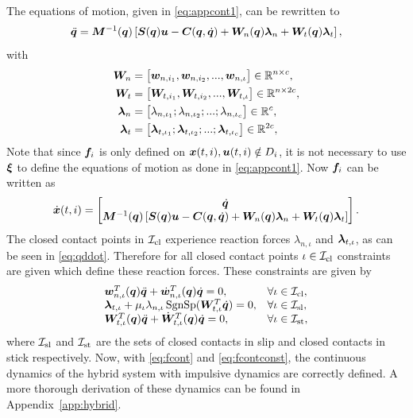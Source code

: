 \documentclass[../DC2017114Bouma.tex]{subfiles}
\begin{document}
The equations of motion, given in \eqref{eq:appcont1}, can be rewritten to
\begin{align}
\ddot{{\boldsymbol{q}}} = {\boldsymbol{M}}^{-1}({\boldsymbol{q}})\left[ {\boldsymbol{S}}({\boldsymbol{q}}){\boldsymbol{u}} - {\boldsymbol{C}}({\boldsymbol{q}},\dot{{\boldsymbol{q}}}) + {\boldsymbol{W}}_{n}({\boldsymbol{q}})\boldsymbol{\lambda}_{n} + {\boldsymbol{W}}_{t}({\boldsymbol{q}})\boldsymbol{\lambda}_{t}\right],\label{eq:qddot}
\end{align}
with
\begin{align}
{\boldsymbol{W}}_n &= \begin{bmatrix}
{\boldsymbol{w}}_{n,i_1},{\boldsymbol{w}}_{n,i_2},...,{\boldsymbol{w}}_{n,\iota}
\end{bmatrix}\in\mathbb{R}^{n\times c},\\
{\boldsymbol{W}}_t &= \begin{bmatrix}
{\boldsymbol{W}}_{t,i_1},{\boldsymbol{W}}_{t,i_2},...,{\boldsymbol{W}}_{t,\iota} 
\end{bmatrix}\in\mathbb{R}^{n\times 2c},\\
\boldsymbol{\lambda}_n &= \begin{bmatrix}
\lambda_{n,\iota_1};\lambda_{n,\iota_2};...;\lambda_{n,\iota_c} 
\end{bmatrix}\in\mathbb{R}^{c},\\
\boldsymbol{\lambda}_t &= \begin{bmatrix}
\boldsymbol{\lambda}_{t,\iota_1};\boldsymbol{\lambda}_{t,\iota_2};...;\boldsymbol{\lambda}_{t,\iota_c} 
\end{bmatrix}\in\mathbb{R}^{2c},
\end{align}
Note that since ${\boldsymbol{f}}_i$ is only defined on ${\boldsymbol{x}}(t,i),{\boldsymbol{u}}(t,i)\notin D_i$, it is not necessary to use $\boldsymbol{\xi}$ to define the equations of motion as done in \eqref{eq:appcont1}. Now ${\boldsymbol{f}}_i$ can be written as
\begin{align}
\dot{{\boldsymbol{x}}}(t,i) =\begin{bmatrix}
\dot{{\boldsymbol{q}}}\\ {\boldsymbol{M}}^{-1}({\boldsymbol{q}})\left[ {\boldsymbol{S}}({\boldsymbol{q}}){\boldsymbol{u}} - {\boldsymbol{C}}({\boldsymbol{q}},\dot{{\boldsymbol{q}}}) + {\boldsymbol{W}}_{n}({\boldsymbol{q}})\boldsymbol{\lambda}_{n} + {\boldsymbol{W}}_{t}({\boldsymbol{q}})\boldsymbol{\lambda}_{t}\right]
\end{bmatrix}.\label{eq:fcont}
\end{align}
The closed contact points in $\mathcal{I}_{\text{cl}}$ experience reaction forces $\lambda_{n,\iota}$ and $\boldsymbol{\lambda}_{t,\iota}$, as can be seen in \eqref{eq:qddot}. Therefore for all closed contact points $\iota\in\mathcal{I}_{\text{cl}}$ constraints are given which define these reaction forces. These constraints are given by
\begin{equation}
\begin{array}{ll}
{\boldsymbol{w}}^T_{n,\iota}({\boldsymbol{q}})\ddot{{\boldsymbol{q}}} + \dot{{\boldsymbol{w}}}^T_{n,\iota}({\boldsymbol{q}})\dot{{\boldsymbol{q}}} = 0, & \forall \iota\in\mathcal{I}_{\text{cl}},\\
\boldsymbol{\lambda}_{t,\iota} + \mu_{\iota}\lambda_{n,\iota}\operatorname{\text{SgnSp}}({\boldsymbol{W}}_{t,\iota}^T\dot{{\boldsymbol{q}}}) = 0, & \forall \iota\in\mathcal{I}_{\text{sl}},\\
{\boldsymbol{W}}^T_{t,\iota}({\boldsymbol{q}})\ddot{{\boldsymbol{q}}} + \dot{{\boldsymbol{W}}}^T_{t,\iota}({\boldsymbol{q}})\dot{{\boldsymbol{q}}} = 0, & \forall \iota\in\mathcal{I}_{\text{st}},
\end{array}\label{eq:fcontconst}
\end{equation}
where $\mathcal{I}_{\text{sl}}$ and $\mathcal{I}_{\text{st}}$ are the sets of closed contacts in slip and closed contacts in stick respectively. Now, with \eqref{eq:fcont} and \eqref{eq:fcontconst}, the continuous dynamics of the hybrid system with impulsive dynamics are correctly defined. A more thorough derivation of these dynamics can be found in Appendix~\ref{app:hybrid}.
\end{document}
